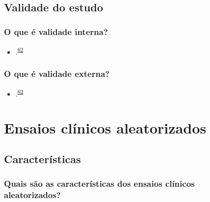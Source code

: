 \documentclass[
]{book}
\providecommand{\tightlist}{%
  \setlength{\itemsep}{0pt}\setlength{\parskip}{0pt}}
\begin{document}
\hypertarget{validade-estudo}{%
\section{Validade do estudo}\label{validade-estudo}}

\hypertarget{o-que-uxe9-validade-interna}{%
\subsection{O que é validade interna?}\label{o-que-uxe9-validade-interna}}

\begin{itemize}
\tightlist
\item
  .\textsuperscript{\protect\hyperlink{ref-findley2021}{62}}
\end{itemize}

\hypertarget{o-que-uxe9-validade-externa}{%
\subsection{O que é validade externa?}\label{o-que-uxe9-validade-externa}}

\begin{itemize}
\tightlist
\item
  .\textsuperscript{\protect\hyperlink{ref-findley2021}{62}}
\end{itemize}

\hypertarget{ensaios-cluxednicos-aleatorizados}{%
\chapter{\texorpdfstring{\textbf{Ensaios clínicos aleatorizados}}{Ensaios clínicos aleatorizados}}\label{ensaios-cluxednicos-aleatorizados}}

\hypertarget{caracteristicas}{%
\section{Características}\label{caracteristicas}}

\hypertarget{quais-suxe3o-as-caracteruxedsticas-dos-ensaios-cluxednicos-aleatorizados}{%
\subsection{Quais são as características dos ensaios clínicos aleatorizados?}\label{quais-suxe3o-as-caracteruxedsticas-dos-ensaios-cluxednicos-aleatorizados}}
\end{document}
